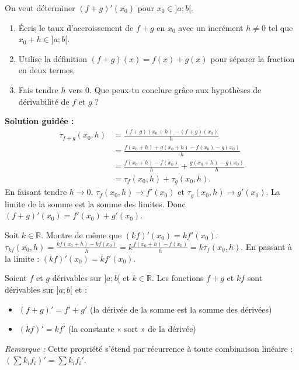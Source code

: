 \documentclass[11pt]{article}
\begin{document}
\begin{experience}
On veut déterminer $(f+g)'(x_0)$ pour $x_0 \in ]a;b[$.
\begin{enumerate}
    \item Écris le taux d'accroissement de $f+g$ en $x_0$ avec un incrément $h \neq 0$ tel que $x_0+h \in ]a;b[$.
    \item Utilise la définition $(f+g)(x) = f(x) + g(x)$ pour séparer la fraction en deux termes.
    \item Fais tendre $h$ vers $0$. Que peux-tu conclure grâce aux hypothèses de dérivabilité de $f$ et $g$ ?
\end{enumerate}
\tcblower
\textbf{Solution guidée :}
\begin{align*}
\tau_{f+g}(x_0, h) &= \frac{(f+g)(x_0+h) - (f+g)(x_0)}{h} \\
&= \frac{f(x_0+h) + g(x_0+h) - f(x_0) - g(x_0)}{h} \\
&= \frac{f(x_0+h) - f(x_0)}{h} + \frac{g(x_0+h) - g(x_0)}{h} \\
&= \tau_f(x_0, h) + \tau_g(x_0, h).
\end{align*}
En faisant tendre $h \to 0$, $\tau_f(x_0, h) \to f'(x_0)$ et $\tau_g(x_0, h) \to g'(x_0)$. La limite de la somme est la somme des limites. Donc $(f+g)'(x_0) = f'(x_0) + g'(x_0)$.
\end{experience}

\begin{experience}
Soit $k \in \mathbb{R}$. Montre de même que $(kf)'(x_0) = k f'(x_0)$.
\tcblower
$\tau_{kf}(x_0, h) = \frac{kf(x_0+h) - kf(x_0)}{h} = k \frac{f(x_0+h) - f(x_0)}{h} = k \tau_f(x_0, h)$. En passant à la limite : $(kf)'(x_0) = k f'(x_0)$.
\end{experience}

\begin{propriete}
Soient $f$ et $g$ dérivables sur $]a;b[$ et $k \in \mathbb{R}$. Les fonctions $f+g$ et $kf$ sont dérivables sur $]a;b[$ et :
\begin{itemize}
    \item $(f+g)' = f' + g'$ \quad (la dérivée de la somme est la somme des dérivées)
    \item $(kf)' = k f'$ \quad (la constante « sort » de la dérivée)
\end{itemize}
\emph{Remarque :} Cette propriété s'étend par récurrence à toute combinaison linéaire : $( \sum k_i f_i )' = \sum k_i f_i'$.
\end{propriete}
\end{document}
